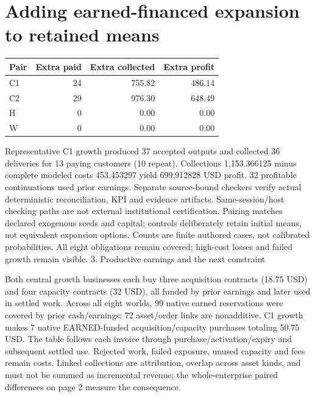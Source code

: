\documentclass[10pt,letterpaper]{article}
\begin{document}
\section*{Adding earned-financed expansion to retained means}
\par\noindent\begin{tabularx}{\linewidth}{@{}Xrrr@{}}\toprule Pair & Extra paid & Extra collected & Extra profit \\ \midrule
C1 & 24 & 755.82 & 486.14 \\
C2 & 29 & 976.30 & 648.49 \\
H & 0 & 0.00 & 0.00 \\
W & 0 & 0.00 & 0.00 \\\bottomrule\end{tabularx}\par
Representative C1 growth produced 37 accepted outputs and collected 36 deliveries for 13 paying customers (10 repeat). Collections 1,153.366125 minus complete modeled costs 453.453297 yield 699.912828 USD profit. 32 profitable continuations used prior earnings. Separate source-bound checkers verify actual deterministic reconciliation, KPI and evidence artifacts. Same-session/host checking paths are not external institutional certification.
\small Pairing matches declared exogenous seeds and capital; controls deliberately retain initial means, not equivalent expansion options. Counts are finite authored cases, not calibrated probabilities. All eight obligations remain covered; high-cost losses and failed growth remain visible.\normalsize
\newpage
{\Large 3. Productive earnings and the next constraint}\par
Both central growth businesses each buy three acquisition contracts (18.75 USD) and four capacity contracts (32 USD), all funded by prior earnings and later used in settled work. Across all eight worlds, 99 native earned reservations were covered by prior cash/earnings; 72 asset/order links are nonadditive. C1 growth makes 7 native EARNED-funded acquisition/capacity purchases totaling 50.75 USD. The table follows each invoice through purchase/activation/expiry and subsequent settled use. Rejected work, failed exposure, unused capacity and fees remain costs. Linked collections are attribution, overlap across asset kinds, and must not be summed as incremental revenue; the whole-enterprise paired differences on page 2 measure the consequence.
\small
\end{document}
